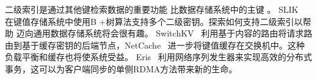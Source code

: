 二级索引是通过其他键检索数据的重要功能
比数据存储系统中的主键 \cite {escriva2012hyperdex,kejriwal2016slik}。 SLIK~ \cite {kejriwal2016slik}在键值存储系统中使用B +树算法支持多个二级密钥。探索如何支持二级索引以帮助 \oursys{} 迈向通用数据存储系统将会很有趣。 SwitchKV~ \cite {li2016fast}利用基于内容的路由将请求路由到基于缓存密钥的后端节点，NetCache~ \cite {netcache-sosp17}进一步将键值缓存在交换机中。这种负载平衡和缓存也将使系统受益。
Eris~ \cite {eris}利用网络序列发生器来实现高效的分布式事务，这可以为客户端同步的单侧RDMA方法带来新的生命。










